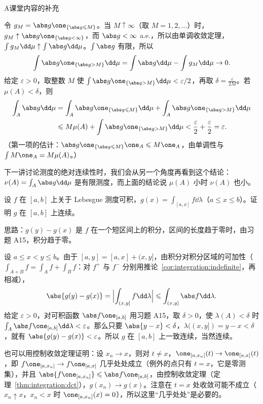 \begin{exercises}{A}{课堂内容的补充}
\begin{solution}
令 $g_M=\abs g\one_{\{\abs g\leqslant M\}}$。当 $M\uparrow\infty$（取 $M=1,2,\dots$）时，$g_M\uparrow\abs g\one_{\{\abs g<\infty\}}$，而 $\abs g<\infty$ a.e.，所以由单调收敛定理，$\int g_M\dd\mu\uparrow\int\abs g\dd\mu$。$\int\abs g$ 有限，所以
\[
\int\abs g\one_{\{\abs g>M\}}\dd\mu=\int\abs g\dd\mu-\int g_M\dd\mu\to0 .
\]
给定 $\varepsilon>0$，取整数 $M$ 使 $\int\abs g\one_{\{\abs g>M\}}\dd\mu<\varepsilon/2$，再取 $\delta=\frac\varepsilon{2M}$。若 $\mu(A)<\delta$，则
\[
\begin{aligned}
\int_A\abs g\dd\mu&=\int_A\abs g\one_{\{\abs g\leqslant M\}}\dd\mu+\int_A\abs g\one_{\{\abs g>M\}}\dd\mu\\
&\leqslant M\mu(A)+\int\abs g\one_{\{\abs g>M\}}\dd\mu<\frac\varepsilon2+\frac\varepsilon2=\varepsilon .
\end{aligned}
\]
（第一项的估计：$\abs g\one_{\{\abs g\leqslant M\}}\one_A\leqslant M\one_A$，由单调性与 $\int M\one_A=M\mu(A)$。）

下一讲讨论测度的绝对连续性时，我们会从另一个角度再看到这个结论：$\nu(A)=\int_A\abs g\dd\mu$ 是有限测度，而上面的结论说 $\mu(A)$ 小时 $\nu(A)$ 也小。
\end{solution}

\item\label{ex:integration:A16} 设 $f$ 在 $[a,b]$ 上关于 Lebesgue 测度可积，$g(x)=\int_{[a,x]}f\dd\lambda$（$a\leqslant x\leqslant b$）。证明 $g$ 在 $[a,b]$ 上连续。
\begin{solution}
思路：$g(y)-g(x)$ 是 $f$ 在一个短区间上的积分，区间的长度趋于零时，由习题 A15，积分趋于零。

设 $a\leqslant x<y\leqslant b$。由于 $[a,y]=[a,x]+(x,y]$，由积分对积分区域的可加性（$\int_{A+B}f=\int_Af+\int_Bf$：对 $f^+$ 与 $f^-$ 分别用推论~\ref{cor:integration:indefinite}，再相减），
\[
\abs{g(y)-g(x)}=\Bigl\lvert\int_{(x,y]}f\dd\lambda\Bigr\rvert\leqslant\int_{(x,y]}\abs f\dd\lambda .
\]
给定 $\varepsilon>0$，对可积函数 $\abs f\one_{[a,b]}$ 用习题 A15，取 $\delta>0$，使 $\lambda(A)<\delta$ 时 $\int_A\abs f\one_{[a,b]}\dd\lambda<\varepsilon$。那么只要 $\abs{y-x}<\delta$，$\lambda((x,y])=y-x<\delta$，就有 $\abs{g(y)-g(x)}<\varepsilon$。所以 $g$ 在 $[a,b]$ 上一致连续，当然连续。

也可以用控制收敛定理证明：设 $x_n\to x$，则对 $t\neq x$，$\one_{[a,x_n]}(t)\to\one_{[a,x]}(t)$，即 $f\one_{[a,x_n]}\to f\one_{[a,x]}$ 几乎处处成立（例外的点只有 $t=x$，它是零测集），并且 $\abs{f\one_{[a,x_n]}}\leqslant\abs f\one_{[a,b]}$，由控制收敛定理（定理~\ref{thm:integration:dct}），$g(x_n)\to g(x)$。注意在 $t=x$ 处收敛可能不成立（$x_n\uparrow x$，$x_n<x$ 时 $\one_{[a,x_n]}(x)=0$），所以这里“几乎处处”是必要的。
\end{solution}
\end{exercises}


